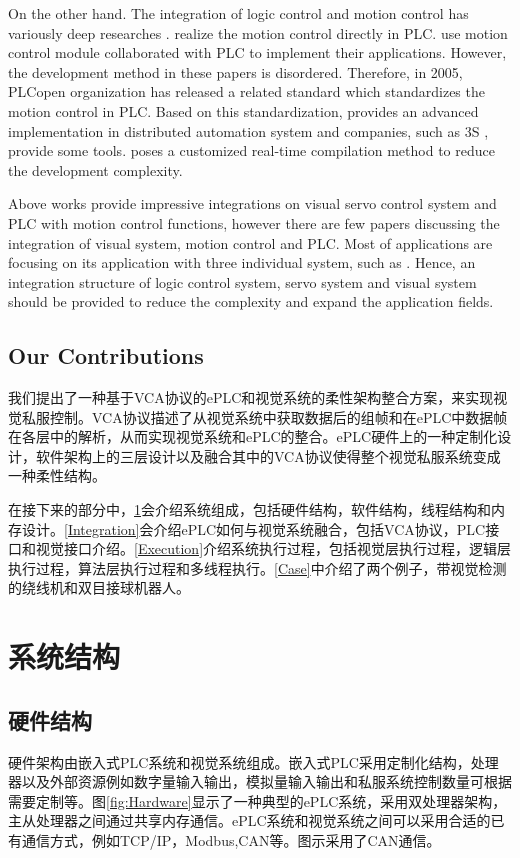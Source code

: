 \documentclass[journal,UTF8]{IEEEtran}
\begin{document}
On the other hand. The integration of logic control and motion control has variously deep researches \cite{Ioannides2004Design,Shi2016The,Fang2017Design, syaichu2011model}. \cite{Ioannides2004Design,syaichu2011model} realize the motion control directly in PLC. \cite{Peng2011Linear, Qian2014A, OMRON2006CS1W} use motion control module collaborated with PLC to implement their applications. However, the development method in these papers is disordered. Therefore, in 2005, PLCopen organization has released a related standard \cite{PLCopen2005Function} which standardizes the motion control in PLC. Based on this standardization, \cite{S2006Advanced} provides an advanced implementation in distributed automation system and companies, such as 3S \cite{3S2017Logic}, provide some tools. \cite{wu2018customized} poses a customized real-time compilation method to reduce the development complexity.

Above works provide impressive integrations on visual servo control system and PLC with motion control functions, however there are few papers discussing the integration of visual system, motion control and PLC. Most of applications are focusing on its application with three individual system, such as \cite{Chen2014A}. Hence, an integration structure of logic control system, servo system and visual system should be provided to reduce the complexity and expand the application fields.

\subsection{Our Contributions}
我们提出了一种基于VCA协议的ePLC和视觉系统的柔性架构整合方案，来实现视觉私服控制。VCA协议描述了从视觉系统中获取数据后的组帧和在ePLC中数据帧在各层中的解析，从而实现视觉系统和ePLC的整合。ePLC硬件上的一种定制化设计，软件架构上的三层设计以及融合其中的VCA协议使得整个视觉私服系统变成一种柔性结构。

在接下来的部分中，\ref{SystemStructure}会介绍系统组成，包括硬件结构，软件结构，线程结构和内存设计。\ref{Integration}会介绍ePLC如何与视觉系统融合，包括VCA协议，PLC接口和视觉接口介绍。\ref{Execution}介绍系统执行过程，包括视觉层执行过程，逻辑层执行过程，算法层执行过程和多线程执行。\ref{Case}中介绍了两个例子，带视觉检测的绕线机和双目接球机器人。

\section{系统结构}
\label{SystemStructure}
\subsection{硬件结构}
硬件架构由嵌入式PLC系统和视觉系统组成。嵌入式PLC采用定制化结构，处理器以及外部资源例如数字量输入输出，模拟量输入输出和私服系统控制数量可根据需要定制等。图\ref{fig:Hardware}显示了一种典型的ePLC系统，采用双处理器架构，主从处理器之间通过共享内存通信。ePLC系统和视觉系统之间可以采用合适的已有通信方式，例如TCP/IP，Modbus,CAN等。图示采用了CAN通信。
\end{document}
